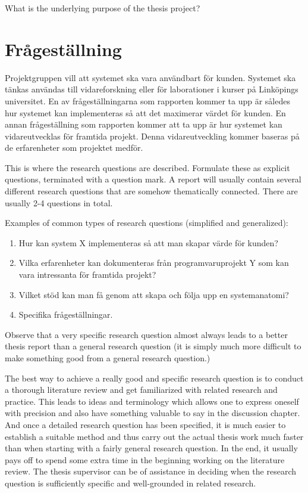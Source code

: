 What is the underlying purpose of the thesis project?

\section{Frågeställning}
\label{sec:research-questions}

Projektgruppen vill att systemet ska vara användbart för kunden. Systemet ska tänkas användas till vidareforskning eller för laborationer i kurser på Linköpings universitet. En av frågeställningarna som rapporten kommer ta upp är således hur systemet kan implementeras så att det maximerar värdet för kunden. En annan frågeställning som rapporten kommer att ta upp är hur systemet kan vidareutvecklas för framtida projekt. Denna vidareutveckling kommer baseras på de erfarenheter som projektet medför.


This is where the research questions are described.
Formulate these as explicit questions, terminated with a
question mark. A report will usually contain several different
research questions that are somehow thematically connected.
There are usually 2-4 questions in total.

Examples of common types of research questions (simplified
and generalized):

\begin{enumerate}
\item Hur kan system X implementeras så att man skapar värde för kunden?

\item Vilka erfarenheter kan dokumenteras från programvaruprojekt Y som kan vara intressanta för framtida projekt?

\item Vilket stöd kan man få genom att skapa och följa upp en systemanatomi?

\item Specifika frågeställningar.

\end{enumerate}


Observe that a very specific research question almost always
leads to a better thesis report than a general research question
(it is simply much more difficult to make something good
from a general research question.)

The best way to achieve a really good and specific research
question is to conduct a thorough literature review and get
familiarized with related research and practice. This leads to
ideas and terminology which allows one to express oneself
with precision and also have something valuable to say in the
discussion chapter. And once a detailed research question
has been specified, it is much easier to establish a suitable
method and thus carry out the actual thesis work much faster
than when starting with a fairly general research question. In
the end, it usually pays off to spend some extra time in the
beginning working on the literature review. The thesis
supervisor can be of assistance in deciding when the research
question is sufficiently specific and well-grounded in related
research.


